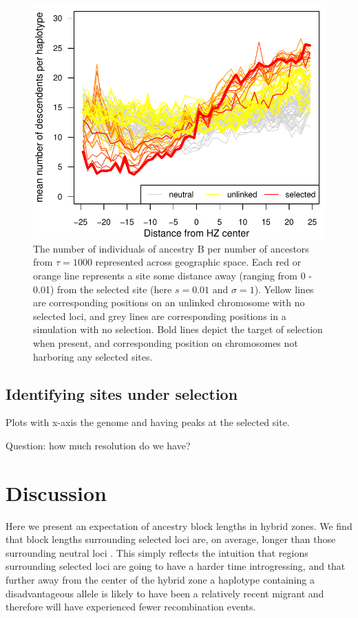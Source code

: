 \documentclass[12pt]{article}
\begin{document}
\begin{figure}
\includegraphics{figs/number_of_ancestors_tau1000}
\caption{The number of individuals of ancestry B per number of ancestors from $\tau=1000$ represented across geographic space. Each red or orange line represents a site some distance away (ranging from 0 - 0.01) from the selected site (here $s=0.01$ and $\sigma=1$). Yellow lines are corresponding positions on an unlinked chromosome with no selected loci, and grey lines are corresponding positions in a simulation with no selection.  Bold lines depict the target of selection when present, and corresponding position on chromosomes not harboring any selected sites.}\label{Fig:family_size}
\end{figure}

\subsection*{Identifying sites under selection}

Plots with x-axis the genome and having peaks at the selected site.

Question: how much resolution do we have?

\section{Discussion}
Here we present an expectation of ancestry block lengths in hybrid zones. We find that block lengths surrounding selected loci are, on average, longer than those surrounding neutral loci . This simply reflects the intuition that regions surrounding selected loci are going to have a harder time introgressing, and that further away from the center of the hybrid zone a haplotype containing a disadvantageous allele is likely to have been a relatively recent migrant and therefore will have experienced fewer recombination events.
\end{document}
